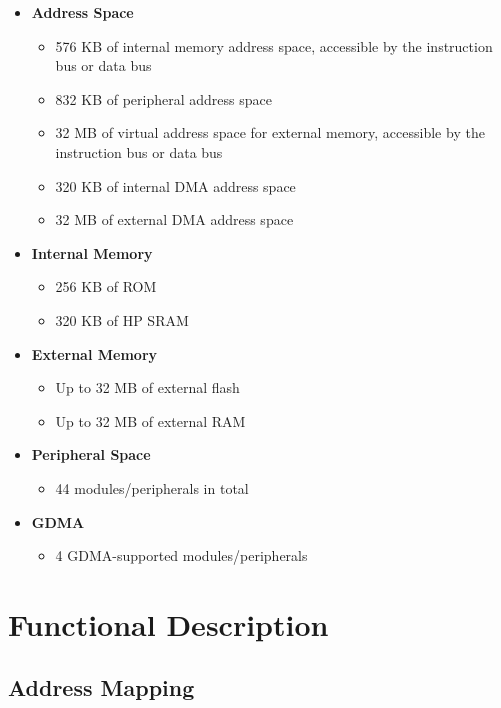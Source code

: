 \documentclass[main\_\_EN.tex]{subfiles}
\begin{document}
\begin{itemize}
    \item {\bfseries Address Space}
        \begin{itemize}
    	    \item 576 KB of internal memory address space, accessible by the instruction bus or data bus
    	    \item 832 KB of peripheral address space
    	    \item 32 MB of virtual address space for external memory, accessible by the instruction bus or data bus
    	    \item 320 KB of internal DMA address space
                \item 32 MB of external DMA address space
        \end{itemize}
    \item {\bfseries Internal Memory}
        \begin{itemize}
            \item 256 KB of ROM 
	    \item 320 KB of HP SRAM
	    \end{itemize}
    \item {\bfseries External Memory}
        \begin{itemize}
            \item Up to 32 MB of external flash
            \item Up to 32 MB of external RAM
	    \end{itemize}
    \item \textbf{Peripheral Space}
        \begin{itemize}
           \item 44 modules/peripherals in total
        \end{itemize}
    \item {\bfseries GDMA}
        \begin{itemize}
            \item 4 GDMA-supported modules/peripherals
        \end{itemize}
\end{itemize}

\section{Functional Description}

\subsection{Address Mapping}
\end{document}
